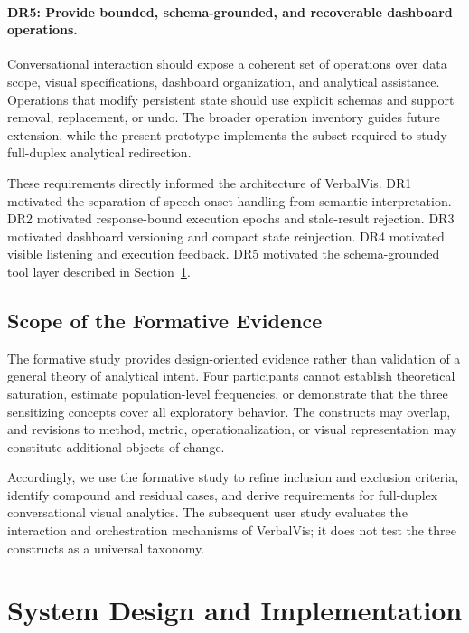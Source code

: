 \documentclass[journal]{IEEEtran}
\begin{document}
\paragraph{DR5: Provide bounded, schema-grounded, and recoverable dashboard operations.}

Conversational interaction should expose a coherent set of operations over
data scope, visual specifications, dashboard organization, and analytical
assistance. Operations that modify persistent state should use explicit
schemas and support removal, replacement, or undo. The broader operation
inventory guides future extension, while the present prototype implements the
subset required to study full-duplex analytical redirection.

These requirements directly informed the architecture of VerbalVis. DR1
motivated the separation of speech-onset handling from semantic
interpretation. DR2 motivated response-bound execution epochs and stale-result
rejection. DR3 motivated dashboard versioning and compact state reinjection.
DR4 motivated visible listening and execution feedback. DR5 motivated the
schema-grounded tool layer described in Section~\ref{sec:system}.

\subsection{Scope of the Formative Evidence}
\label{sec:formative-limitations}

The formative study provides design-oriented evidence rather than validation
of a general theory of analytical intent. Four participants cannot establish
theoretical saturation, estimate population-level frequencies, or demonstrate
that the three sensitizing concepts cover all exploratory behavior. The
constructs may overlap, and revisions to method, metric, operationalization,
or visual representation may constitute additional objects of change.

Accordingly, we use the formative study to refine inclusion and exclusion
criteria, identify compound and residual cases, and derive requirements for
full-duplex conversational visual analytics. The subsequent user study
evaluates the interaction and orchestration mechanisms of VerbalVis; it does
not test the three constructs as a universal taxonomy.

\section{System Design and Implementation}
\label{sec:system}
\end{document}
